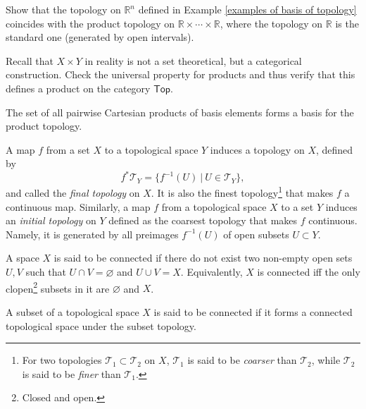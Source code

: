 \documentclass[english,letterpaper]{article}%
\numberwithin{equation}{section}
\numberwithin{figure}{section}
\numberwithin{table}{section}
\theoremstyle{definition}
\theoremstyle{definition}
\theoremstyle{definition}
\theoremstyle{plain}
\theoremstyle{plain}
\theoremstyle{plain}
\theoremstyle{plain}
\theoremstyle{remark}
\theoremstyle{remark}
\newcommand{\PRLsep}{   %
           \noindent\makebox[\linewidth]{
                \resizebox{0.5\linewidth}{1pt}{$\blacklozenge$}}}
\begin{document}
\begin{xca}
Show that the topology on $\mathbb{R}^n$ defined in Example \ref{examples of basis of topology} coincides with the product topology on $\mathbb R\times \cdots \times \mathbb R$, where the topology on $\mathbb{R}$ is the standard one (generated by open intervals).
\end{xca}
\begin{xca}
Recall that $X\times Y$ in reality is not a set theoretical, but a categorical construction. Check the universal property for products and thus verify that this defines a product on the category $\mathsf{Top}$.
\end{xca}

\begin{rem}
The set of all pairwise Cartesian products of basis elements forms a basis for the product topology.
\end{rem}

\begin{defn}
A map $f$ from a set $X$ to a topological space $Y$ induces a topology on $X$, defined by
\begin{equation}
    f^* \mathcal{T}_Y = \{ f^{-1}(U) ~|~ U\in \mathcal{T}_Y \},
\end{equation}
and called the \emph{final topology} on $X$. It is also the finest topology\footnote{For two topologies $\mathcal{T}_1 \subset \mathcal{T}_2$ on $X$, $\mathcal{T}_1$ is said to be \emph{coarser} than $\mathcal{T}_2$, while $\mathcal{T}_2$ is said to be \emph{finer} than $\mathcal{T}_1$.} that makes $f$ a continuous map. Similarly, a map $f$ from a topological space $X$ to a set $Y$ induces an \emph{initial topology} on $Y$ defined as the coarsest topology that makes $f$ continuous. Namely, it is generated by all preimages $f^{-1}(U)$ of open subsets $U\subset Y$.
\end{defn}

\begin{defn}
A space $X$ is said to be connected if there do not exist two non-empty open sets $U,V$ such that $U\cap V=\varnothing$ and $U\cup V=X$.
Equivalently, $X$ is connected iff the only clopen\footnote{Closed and open.} subsets in it are $\varnothing$ and $X$.
\end{defn}

\PRLsep

\begin{defn}
A subset of a topological space $X$ is said to be connected if it forms a connected topological space under the subset topology.
\end{defn}
\end{document}
